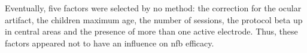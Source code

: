 Eventually, five factors were selected by no method: the correction for the ocular artifact, the children maximum age, the number of sessions,
the protocol beta up in central areas and the presence of more than one active electrode. Thus, these factors appeared not to have an influence on
\gls{nfb} efficacy.   

